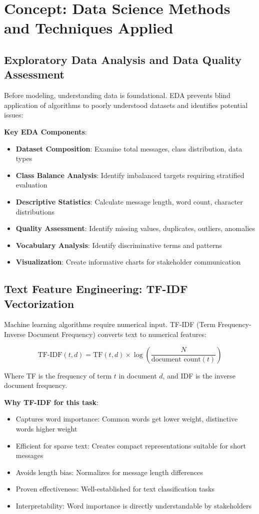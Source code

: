\documentclass[12pt,a4paper]{article}
\begin{document}
\section{Concept: Data Science Methods and Techniques Applied}

\subsection{Exploratory Data Analysis and Data Quality Assessment}

Before modeling, understanding data is foundational. EDA prevents blind application of algorithms to poorly understood datasets and identifies potential issues:

\textbf{Key EDA Components}:
\begin{itemize}
    \item \textbf{Dataset Composition}: Examine total messages, class distribution, data types
    \item \textbf{Class Balance Analysis}: Identify imbalanced targets requiring stratified evaluation
    \item \textbf{Descriptive Statistics}: Calculate message length, word count, character distributions
    \item \textbf{Quality Assessment}: Identify missing values, duplicates, outliers, anomalies
    \item \textbf{Vocabulary Analysis}: Identify discriminative terms and patterns
    \item \textbf{Visualization}: Create informative charts for stakeholder communication
\end{itemize}

\subsection{Text Feature Engineering: TF-IDF Vectorization}

Machine learning algorithms require numerical input. TF-IDF (Term Frequency-Inverse Document Frequency) converts text to numerical features:

\begin{equation}
\text{TF-IDF}(t,d) = \text{TF}(t,d) \times \log\left(\frac{N}{\text{document count}(t)}\right)
\end{equation}

Where TF is the frequency of term $t$ in document $d$, and IDF is the inverse document frequency.

\textbf{Why TF-IDF for this task}:
\begin{itemize}
    \item Captures word importance: Common words get lower weight, distinctive words higher weight
    \item Efficient for sparse text: Creates compact representations suitable for short messages
    \item Avoids length bias: Normalizes for message length differences
    \item Proven effectiveness: Well-established for text classification tasks
    \item Interpretability: Word importance is directly understandable by stakeholders
\end{itemize}
\end{document}
